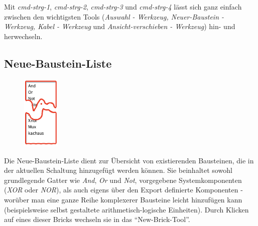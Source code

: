 \documentclass[12pt,a4paper]{scrartcl}
\newcommand{\fckNewBrickList}{Neue-Baustein-Liste\xspace}
\newcommand{\fckNewBrickTool}{Neuer-Baustein - Werkzeug\xspace}
\newcommand{\fckWireTool}{Kabel - Werkzeug\xspace}
\newcommand{\fckSelectTool}{Auswahl - Werkzeug\xspace}
\newcommand{\fckMoveViewportTool}{Ansicht-verschieben - Werkzeug\xspace}
\begin{document}
\begin{info}
	Mit \textit{\gls{cmd-strg-1}}, \textit{\gls{cmd-strg-2}}, \textit{\gls{cmd-strg-3}} und \textit{\gls{cmd-strg-4}} lässt sich ganz einfach zwischen den wichtigsten Tools (\textit{\fckSelectTool, \fckNewBrickTool, \fckWireTool} und \textit{\fckMoveViewportTool}) hin- und herwechseln.
\end{info}

\subsection{\fckNewBrickList}
		\setlength{\intextsep}{0pt}
		\begin{figure}
		      \centering
		      \includegraphics[width=1.8cm]{images/neueBilder/blicklist.png}
		\end{figure}
		Die \fckNewBrickList dient zur Übersicht von existierenden Bausteinen, die in der aktuellen Schaltung hinzugefügt werden können. Sie beinhaltet sowohl grundlegende Gatter wie \textit{And}, \textit{Or} und \textit{Not}, vorgegebene Systemkomponenten (\textit{XOR} oder \textit{NOR}), als auch eigens über den Export definierte Komponenten - worüber man eine ganze Reihe komplexerer Bausteine leicht hinzufügen kann (beispielsweise selbst gestaltete arithmetisch-logische Einheiten). Durch Klicken auf eines dieser Bricks wechseln sie in das ``New-Brick-Tool''.
\end{document}
